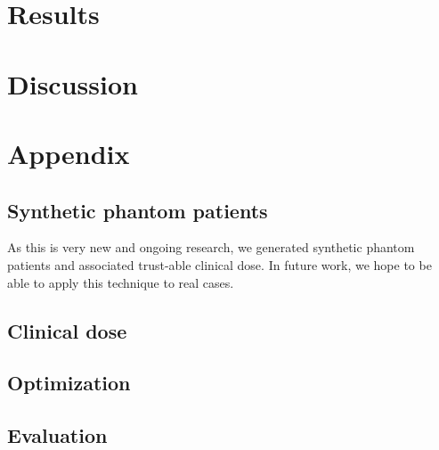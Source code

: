 \section{Results}

\section{Discussion}


\section*{Appendix}

\subsection*{Synthetic phantom patients}
As this is very new and ongoing research, we generated synthetic phantom patients and associated trust-able clinical dose.
In future work, we hope to be able to apply this technique to real cases.

\subsection*{Clinical dose}

\subsection*{Optimization}

\subsection*{Evaluation}

